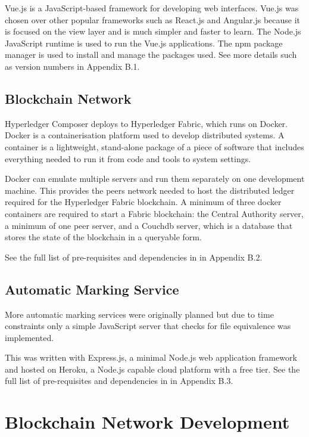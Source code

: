 Vue.js is a JavaScript-based framework for developing web interfaces. Vue.js was chosen over other 
popular frameworks such as React.js and Angular.js because it is focused on the view layer and is much 
simpler and faster to learn. The Node.js JavaScript runtime is used to run the Vue.js applications. The npm package manager 
is used to install and manage the packages used. See more details such as version numbers in Appendix B.1.

\subsection{Blockchain Network}

Hyperledger Composer deploys to Hyperledger Fabric, which runs on Docker.
Docker is a containerisation platform used to develop distributed systems. 
A container is a lightweight, stand-alone package of a piece of software that includes everything 
needed to run it from code and tools to system settings. 

Docker can emulate multiple servers and run them separately on one development machine. 
This provides the peers network needed to host the distributed ledger required for the 
Hyperledger Fabric blockchain. A minimum of three docker containers are required to start a 
Fabric blockchain: the Central Authority server, a minimum of one peer server, and a Couchdb server, 
which is a database that stores the state of the blockchain in a queryable form.

See the full list of pre-requisites and dependencies in in Appendix B.2.

\subsection{Automatic Marking Service}

More automatic marking services were originally planned but due to time constraints only 
a simple JavaScript server that checks for file equivalence was implemented. 

This was written with Express.js, a minimal Node.js web application framework and hosted 
on Heroku, a Node.js capable cloud platform with a free tier. See the full list of pre-requisites and dependencies in in Appendix B.3.

\section{Blockchain Network Development}

